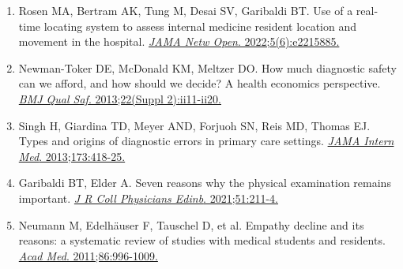 \documentclass[11pt,a4paper]{article}
\begin{document}
\begin{enumerate}[leftmargin=*]

\item Rosen MA, Bertram AK, Tung M, Desai SV, Garibaldi BT. Use of a real-time locating system to assess internal medicine resident location and movement in the hospital. \href{https://doi.org/10.1001/jamanetworkopen.2022.15885}{\textit{JAMA Netw Open}. 2022;5(6):e2215885.}


\item Newman-Toker DE, McDonald KM, Meltzer DO. How much diagnostic safety can we afford, and how should we decide? A health economics perspective. \href{https://doi.org/10.1136/bmjqs-2012-001616}{\textit{BMJ Qual Saf}. 2013;22(Suppl 2):ii11-ii20.}

\item Singh H, Giardina TD, Meyer AND, Forjuoh SN, Reis MD, Thomas EJ. Types and origins of diagnostic errors in primary care settings. \href{https://doi.org/10.1001/jamainternmed.2013.2777}{\textit{JAMA Intern Med}. 2013;173:418-25.}

\item Garibaldi BT, Elder A. Seven reasons why the physical examination remains important. \href{https://doi.org/10.4997/jrcpe.2021.301}{\textit{J R Coll Physicians Edinb}. 2021;51:211-4.}

\item Neumann M, Edelhäuser F, Tauschel D, et al. Empathy decline and its reasons: a systematic review of studies with medical students and residents. \href{https://doi.org/10.1097/ACM.0b013e318221e615}{\textit{Acad Med}. 2011;86:996-1009.}




\end{enumerate}
\end{document}
